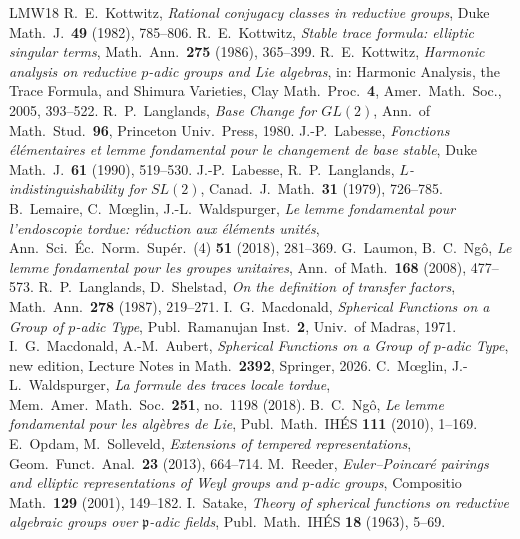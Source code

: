 \documentclass[12pt,letterpaper]{article}
\numberwithin{equation}{section}
\theoremstyle{plain}
\theoremstyle{remark}
\theoremstyle{plain}
\theoremstyle{definition}
\theoremstyle{remark}
\theoremstyle{remark}
\begin{document}
\begin{thebibliography}{LMW18}
 R.~E.~Kottwitz, \emph{Rational conjugacy classes in reductive groups}, Duke Math.\ J.\ \textbf{49} (1982), 785--806.
 R.~E.~Kottwitz, \emph{Stable trace formula: elliptic singular terms}, Math.\ Ann.\ \textbf{275} (1986), 365--399.
 R.~E.~Kottwitz, \emph{Harmonic analysis on reductive $p$-adic groups and Lie algebras}, in: Harmonic Analysis, the Trace Formula, and Shimura Varieties, Clay Math.\ Proc.\ \textbf{4}, Amer.\ Math.\ Soc., 2005, 393--522.
 R.~P.~Langlands, \emph{Base Change for $GL(2)$}, Ann.\ of Math.\ Stud.\ \textbf{96}, Princeton Univ.\ Press, 1980.
 J.-P.~Labesse, \emph{Fonctions \'el\'ementaires et lemme fondamental pour le changement de base stable}, Duke Math.\ J.\ \textbf{61} (1990), 519--530.
 J.-P.~Labesse, R.~P.~Langlands, \emph{$L$-indistinguishability for $SL(2)$}, Canad.\ J.\ Math.\ \textbf{31} (1979), 726--785.
 B.~Lemaire, C.~M\oe glin, J.-L.~Waldspurger, \emph{Le lemme fondamental pour l'endoscopie tordue: r\'eduction aux \'el\'ements unit\'es}, Ann.\ Sci.\ \'Ec.\ Norm.\ Sup\'er.\ (4) \textbf{51} (2018), 281--369.
 G.~Laumon, B.~C.~Ng\^o, \emph{Le lemme fondamental pour les groupes unitaires}, Ann.\ of Math.\ \textbf{168} (2008), 477--573.
 R.~P.~Langlands, D.~Shelstad, \emph{On the definition of transfer factors}, Math.\ Ann.\ \textbf{278} (1987), 219--271.
 I.~G.~Macdonald, \emph{Spherical Functions on a Group of $p$-adic Type}, Publ.\ Ramanujan Inst.\ \textbf{2}, Univ.\ of Madras, 1971.
 I.~G.~Macdonald, A.-M.~Aubert, \emph{Spherical Functions on a Group of $p$-adic Type}, new edition, Lecture Notes in Math.\ \textbf{2392}, Springer, 2026.
 C.~M\oe glin, J.-L.~Waldspurger, \emph{La formule des traces locale tordue}, Mem.\ Amer.\ Math.\ Soc.\ \textbf{251}, no.~1198 (2018).
 B.~C.~Ng\^o, \emph{Le lemme fondamental pour les alg\`ebres de Lie}, Publ.\ Math.\ IH\'ES \textbf{111} (2010), 1--169.
 E.~Opdam, M.~Solleveld, \emph{Extensions of tempered representations}, Geom.\ Funct.\ Anal.\ \textbf{23} (2013), 664--714.
 M.~Reeder, \emph{Euler--Poincar\'e pairings and elliptic representations of Weyl groups and $p$-adic groups}, Compositio Math.\ \textbf{129} (2001), 149--182.
 I.~Satake, \emph{Theory of spherical functions on reductive algebraic groups over $\mathfrak p$-adic fields}, Publ.\ Math.\ IH\'ES \textbf{18} (1963), 5--69.

\end{thebibliography}
\end{document}
